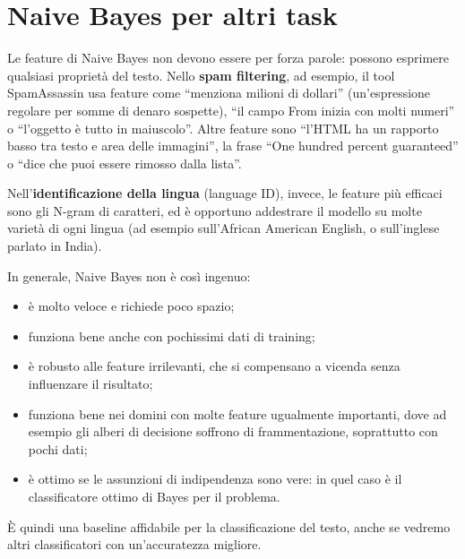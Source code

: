 \section{Naive Bayes per altri task}
Le feature di Naive Bayes non devono essere per forza parole: possono esprimere qualsiasi proprietà del testo. Nello \textbf{spam filtering}, ad esempio, il tool SpamAssassin usa feature come \enquote{menziona milioni di dollari} (un'espressione regolare per somme di denaro sospette), \enquote{il campo From inizia con molti numeri} o \enquote{l'oggetto è tutto in maiuscolo}. Altre feature sono \enquote{l'HTML ha un rapporto basso tra testo e area delle immagini}, la frase \enquote{One hundred percent guaranteed} o \enquote{dice che puoi essere rimosso dalla lista}.

Nell'\textbf{identificazione della lingua} (language ID), invece, le feature più efficaci sono gli N-gram di caratteri, ed è opportuno addestrare il modello su molte varietà di ogni lingua (ad esempio sull'African American English, o sull'inglese parlato in India).

In generale, Naive Bayes non è così ingenuo:
\begin{itemize}
    \item è molto veloce e richiede poco spazio;
    \item funziona bene anche con pochissimi dati di training;
    \item è robusto alle feature irrilevanti, che si compensano a vicenda senza influenzare il risultato;
    \item funziona bene nei domini con molte feature ugualmente importanti, dove ad esempio gli alberi di decisione soffrono di frammentazione, soprattutto con pochi dati;
    \item è ottimo se le assunzioni di indipendenza sono vere: in quel caso è il classificatore ottimo di Bayes per il problema.
\end{itemize}
È quindi una baseline affidabile per la classificazione del testo, anche se vedremo altri classificatori con un'accuratezza migliore.

